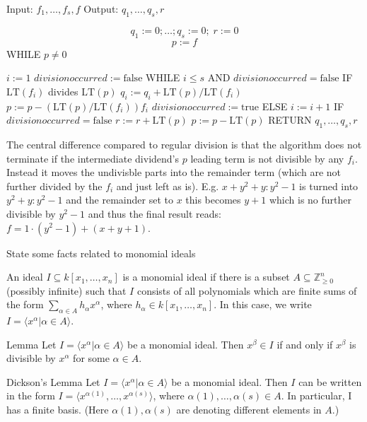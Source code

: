 Input: \( f_1, \ldots, f_s, f \)
Output: \( q_1, \ldots, q_s, r \)

\[
q_1 := 0; \ldots; q_s := 0;\; r := 0
\]
\[
p := f
\]
WHILE \( p \ne 0 \) {
    \( i := 1 \)
    \( divisionoccurred := \mathrm{false} \)
    WHILE \( i \leq s \) AND \( divisionoccurred = \mathrm{false} \) {
        IF \( \mathrm{LT}(f_i) \) divides \( \mathrm{LT}(p) \) {
            \( q_i := q_i + \mathrm{LT}(p)/\mathrm{LT}(f_i) \)
            \( p := p - (\mathrm{LT}(p)/\mathrm{LT}(f_i)) f_i \)
            \( divisionoccurred := \mathrm{true} \)
        } ELSE {
            \( i := i + 1 \)
        }
    }
    IF \( divisionoccurred = \mathrm{false} \) {
        \( r := r + \mathrm{LT}(p) \)
        \( p := p - \mathrm{LT}(p) \)
    }
RETURN \( q_1, \ldots, q_s, r \)

The central difference compared to regular division is that the algorithm does not terminate if the intermediate 
dividend's \( p \) leading term is not divisible by any \( f_i \). Instead it moves the undivisble parts into the remainder 
term (which are not further divided by the \( f_i \) and just left as is).
E.g. \( x + y^2 + y : y^2 - 1 \) is turned into \( y^2 + y : y^2 - 1 \) and the remainder set to \( x \)
this becomes \( y + 1  \) which is no further divisible by \( y^2 - 1 \) and thus the final result reads:
\( f = 1\cdot (y^2 - 1) + (x + y + 1) \).



State some facts related to monomial ideals

An ideal \( I \subseteq k[x_1, \dots, x_n] \) is a monomial ideal if there is a subset
\( A \subseteq \mathbb{Z}^n_{\geq 0} \) (possibly infinite) such that \( I \) consists of all polynomials which are finite
sums of the form \( \sum_{\alpha \in A} h_{\alpha}x^\alpha \), where \( h_\alpha \in k[x_1, \dots, x_n] \). 
In this case, we write \( I = \langle x^\alpha | \alpha \in A \rangle \).

Lemma Let \( I = \langle x^\alpha | \alpha \in A \rangle  \) be a monomial ideal. 
Then \( x^\beta \in I \) if and only if \( x^\beta \) is divisible by \( x^\alpha \) for some \( \alpha \in A \).

Dickson's Lemma
Let \( I = \langle x^\alpha | \alpha \in A \rangle \) be a monomial ideal. 
Then \( I \) can be written in the form \( I = \langle x^{\alpha(1)}, \dots, x^{\alpha(s)} \rangle \), where
\( \alpha(1), \dots, \alpha(s) \in A \). In particular, I has a finite basis.
(Here \( \alpha(1), \alpha(s) \) are denoting different elements in \( A \).)

}
